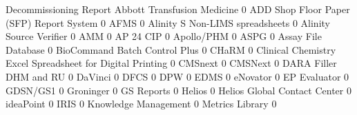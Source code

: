 \documentclass{article}
\begin{document}
\begin{Schunk}
\begin{Soutput}
                                                            Decommissioning Report
  Abbott Transfusion Medicine                                                    0
  ADD Shop Floor Paper (SFP) Report System                                       0
  AFMS                                                                           0
  Alinity S Non-LIMS spreadsheets                                                0
  Alinity Source Verifier                                                        0
  AMM                                                                            0
  AP 24 CIP                                                                      0
  Apollo/PHM                                                                     0
  ASPG                                                                           0
  Assay File Database                                                            0
  BioCommand Batch Control Plus                                                  0
  CHaRM                                                                          0
  Clinical Chemistry Excel Spreadsheet for Digital Printing                      0
  CMSnext                                                                        0
  CMSNext                                                                        0
  DARA Filler DHM and RU                                                         0
  DaVinci                                                                        0
  DFCS                                                                           0
  DPW                                                                            0
  EDMS                                                                           0
  eNovator                                                                       0
  EP Evaluator                                                                   0
  GDSN/GS1                                                                       0
  Groninger                                                                      0
  GS Reports                                                                     0
  Helios                                                                         0
  Helios Global Contact Center                                                   0
  ideaPoint                                                                      0
  IRIS                                                                           0
  Knowledge Management                                                           0
  Metrics Library                                                                0

\end{Soutput}
\end{Schunk}
\end{document}
